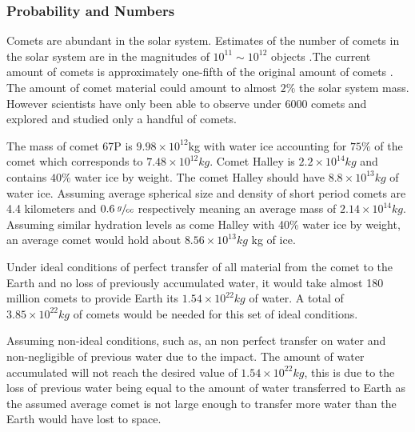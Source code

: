 \documentclass{article}
\begin{document}
\subsubsection{Probability and Numbers}

Comets are abundant in the solar system. Estimates of the number of comets in the solar system are in the magnitudes of \(10^{11}\sim 10^{12}\) objects \cite{Comet_Num}.The current amount of comets is approximately one-fifth of the original amount of comets \cite{Comet_AvgSz}. The amount of comet material could amount to almost \(2\%\) \cite{Comet_AvgSz} the solar system mass. However scientists have only been able to observe under \(6000\) \cite{observed_objects} comets and explored and studied only a handful of comets.

The mass of comet 67P is \(9.98 \times 10^{12}\)kg \cite{67P_Mass} with water ice accounting for \(75\%\) \cite{67P_Water} of the comet which corresponds to \(7.48 \times 10^{12} kg\).
Comet Halley is \(2.2 \times 10^{14}kg\) \cite{Cevolani1987} and contains \(40\% \) water ice \cite{Comet_Yeomans} by weight. The comet Halley should have \(8.8 \times 10^{13} kg\) of water ice.
Assuming average spherical size and density of short period comets are 4.4 kilometers \cite{comet_AvgSz} and \(0.6 \: \sfrac{g}{cc}\) \cite{Britt2006SmallBD} respectively meaning an average mass of \(2.14 \times 10^{14}kg\). Assuming similar hydration levels as come Halley with 40\% water ice by weight, an average comet would hold about \(8.56 \times 10^{13}kg\) kg of ice.

Under ideal conditions of perfect transfer of all material from the comet to the Earth and no loss of previously accumulated water, it would take almost 180 million comets to provide Earth its \(1.54\times 10^{22} kg\) of water. A total of \(3.85\times 10^{22} kg\) of comets would be needed for this set of ideal conditions.

Assuming non-ideal conditions, such as, an non perfect transfer on water and non-negligible of previous water  due to the impact. The amount of water accumulated will not reach the desired value of \(1.54\times 10^{22} kg\), this is due to the loss of previous water being equal to the amount of water transferred to Earth as the assumed average comet is not large enough to transfer more water than the Earth would have lost to space.
\end{document}
